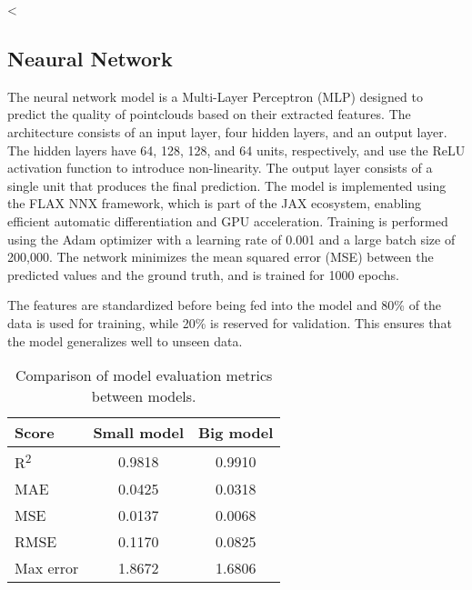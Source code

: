 <\subsection{Neaural Network}
The neural network model is a Multi-Layer Perceptron (MLP) designed to predict the quality of pointclouds based on their extracted features. The architecture consists of an input layer, four hidden layers, and an output layer. The hidden layers have 64, 128, 128, and 64 units, respectively, and use the ReLU activation function to introduce non-linearity. The output layer consists of a single unit that produces the final prediction. The model is implemented using the FLAX NNX framework, which is part of the JAX ecosystem, enabling efficient automatic differentiation and GPU acceleration. Training is performed using the Adam optimizer with a learning rate of 0.001 and a large batch size of 200,000. The network minimizes the mean squared error (MSE) between the predicted values and the ground truth, and is trained for 1000 epochs.

The features are standardized before being fed into the model and 80\% of the data is used for training, while 20\% is reserved for validation. This ensures that the model generalizes well to unseen data. 


\begin{table}[htbp]
\centering
\begin{tabular}{|l|c|c|}
\hline
\textbf{Score} & \textbf{Small model} & \textbf{Big model} \\
\hline
R\textsuperscript{2} & 0.9818 & 0.9910 \\
MAE & 0.0425 & 0.0318 \\
MSE & 0.0137 & 0.0068 \\
RMSE & 0.1170 & 0.0825 \\
Max error & 1.8672 & 1.6806 \\
\hline
\end{tabular}
\vspace{0.5em}  %
\caption{Comparison of model evaluation metrics between models.}
\label{tab:model_metrics}
\end{table}